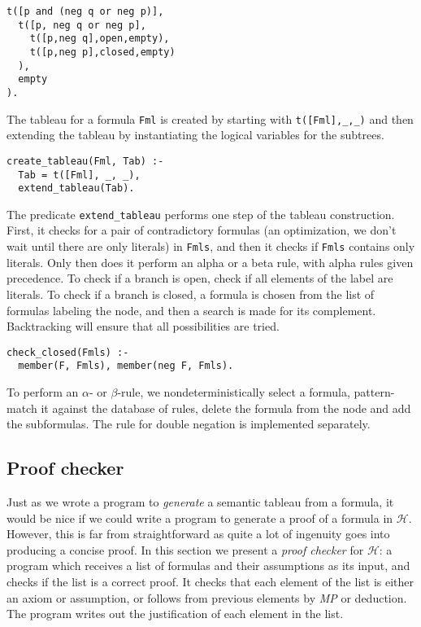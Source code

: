 \documentclass[11pt]{article}
\newcommand*{\p}[1]{\textup{\texttt{#1}}}
\begin{document}
\begin{verbatim}
t([p and (neg q or neg p)],
  t([p, neg q or neg p],
    t([p,neg q],open,empty),
    t([p,neg p],closed,empty)
  ),
  empty
).
\end{verbatim}

The tableau for a formula \p{Fml} is created by starting with
\p{t([Fml],\_,\_)} and then extending the tableau by instantiating the
logical variables for the subtrees.

\begin{verbatim}
create_tableau(Fml, Tab) :-
  Tab = t([Fml], _, _), 
  extend_tableau(Tab).
\end{verbatim}

The predicate \p{extend\_tableau} performs one step of the tableau
construction. First, it checks for a pair of contradictory formulas (an
optimization, we don't wait until there are only literals) in \p{Fmls},
and then it checks if \p{Fmls} contains only literals. Only then does it
perform an alpha or a beta rule, with alpha rules given precedence. To
check if a branch is open, check if all elements of the label are
literals. To check if a branch is closed, a formula is chosen from the
list of formulas labeling the node, and then a search is made for its
complement. Backtracking will ensure that all possibilities are tried.

\begin{verbatim}
check_closed(Fmls) :-
  member(F, Fmls), member(neg F, Fmls).
\end{verbatim}

To perform an $\alpha$- or $\beta$-rule, we nondeterministically select
a formula, pattern-match it against the database of rules, delete the
formula from the node and add the subformulas. The rule for double
negation is implemented separately.



\subsection{Proof checker}\label{s.checkprop}

Just as we wrote a program to \emph{generate} a semantic tableau from a
formula, it would be nice if we could write a program to generate a
proof of a formula in $\mathcal{H}$. However, this is far from
straightforward as quite a lot of ingenuity goes into producing a
concise proof. In this section we present a \emph{proof checker}
for $\mathcal{H}$: a program which receives a list of formulas and their
assumptions as its input, and checks if the list is a correct proof. It
checks that each element of the list is either an axiom or assumption,
or follows from previous elements by \emph{MP} or deduction. The program
writes out the justification of each element in the list.
 
\end{document}
